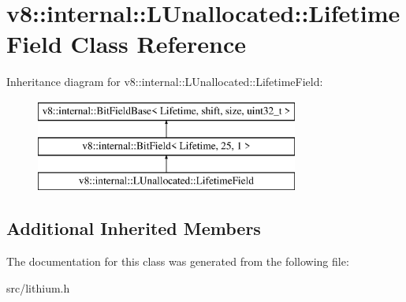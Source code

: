 \hypertarget{classv8_1_1internal_1_1_l_unallocated_1_1_lifetime_field}{}\section{v8\+:\+:internal\+:\+:L\+Unallocated\+:\+:Lifetime\+Field Class Reference}
\label{classv8_1_1internal_1_1_l_unallocated_1_1_lifetime_field}
Inheritance diagram for v8\+:\+:internal\+:\+:L\+Unallocated\+:\+:Lifetime\+Field\+:\begin{figure}[H]
\begin{center}
\leavevmode
\includegraphics[height=3.000000cm]{classv8_1_1internal_1_1_l_unallocated_1_1_lifetime_field}
\end{center}
\end{figure}
\subsection*{Additional Inherited Members}


The documentation for this class was generated from the following file\+:\begin{DoxyCompactItemize}
\item 
src/lithium.\+h\end{DoxyCompactItemize}
